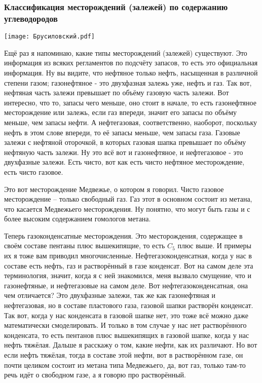 \documentclass[main.tex]{subfiles}
\begin{document}
\subsubsection{Классификация месторождений (залежей) по содержанию углеводородов}

\begin{center}
\texttt{[image: Брусиловский.pdf]}
\end{center}

Ещё раз я напоминаю, какие типы месторождений (залежей) существуют.
Это информация из всяких регламентов по подсчёту запасов, то есть это официальная информация.
Ну вы видите, что нефтяное только нефть, насыщенная в различной степени газом; газонефтяное - это двухфазная залежь уже, нефть и газ.
Так вот, нефтяная часть залежи превышает по объёму газовую часть залежи.
Вот интересно, что то, запасы чего меньше, оно стоит в начале, то есть газонефтяное месторождение или залежь, если газ впереди, значит его запасы по объёму меньше, чем запасы нефти.
А нефтегазовая, соответственно, наоборот, поскольку нефть в этом слове впереди, то её запасы меньше, чем запасы газа.
Газовые залежи с нефтяной оторочкой, в которых газовая шапка превышает по объёму нефтяную часть залежи.
Ну это всё вот и газонефтяное, и нефтегазовое - это двухфазные залежи.
Есть чисто, вот как есть чисто нефтяное месторождение, есть чисто газовое.

Это вот месторождение Медвежье, о котором я говорил.
Чисто газовое месторождение -- только свободный газ.
Газ этот в основном состоит из метана, что касается Медвежьего месторождения.
Ну понятно, что могут быть газы и с более высоким содержанием гомологов метана.

Теперь газоконденсатные месторождения.
Это месторождения, содержащее в своём составе пентаны плюс вышекипящие, то есть $C_5$ плюс выше.
И примеры их я тоже вам приводил многочисленные.
Нефтегазоконденсатная, когда у нас в составе есть нефть, газ и растворённый в газе конденсат.
Вот на самом деле эта терминология, значит, когда я с ней знакомился, меня вызвало смущение, что и газонефтяные, и нефтегазовые на самом деле.
Вот нефтегазоконденсатная, она чем отличается?
Это двухфазные залежи, так же как газонефтяная и нефтегазовая, но в составе пластового газа, газовой шапки растворён конденсат.
Так вот, когда у нас конденсата в газовой шапке нет, это тоже всё можно даже математически смоделировать.
И только в том случае у нас нет растворённого конденсата, то есть пентанов плюс вышекипящих в газовой шапке, когда у нас нефть тяжёлая.
Дальше я расскажу о том, какие нефти, как их различают.
Но вот если нефть тяжёлая, тогда в составе этой нефти, вот в растворённом газе, он почти целиком состоит из метана типа Медвежьего, да, вот газ, только там-то речь идёт о свободном газе, а я говорю про растворённый.
\end{document}
